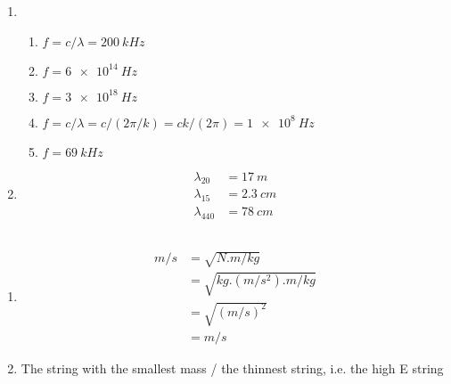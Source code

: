 \documentclass{article}
\begin{document}
\begin{enumerate}
  \item

        \begin{enumerate}
          \item $f = c / \lambda = \qty{200}{kHz}$

          \item $f = \qty{6e14}{Hz}$

          \item $f = \qty{3e18}{Hz}$

          \item $f = c / \lambda = c / (2 \pi / k) = c k / (2 \pi) = \qty{1e8}{Hz}$

          \item $f = \qty{69}{kHz}$
        \end{enumerate}

  \item

        \begin{align*}
          \lambda_{20}  & = \qty{17}{m}   \\
          \lambda_{15}  & = \qty{2.3}{cm} \\
          \lambda_{440} & = \qty{78}{cm}
        \end{align*}
\end{enumerate}

\subsection{}

\begin{enumerate}
  \item

        \begin{align*}
          \unit{m/s} & = \sqrt{\unit{N.m/kg}}   \\
                     & = \sqrt{kg.(m/s^2).m/kg} \\
                     & = \sqrt{\unit{(m/s)^2}}  \\
                     & = \unit{m/s}
        \end{align*}

  \item The string with the smallest mass / the thinnest string, i.e. the high E string
\end{enumerate}

\subsection{}
\end{document}
